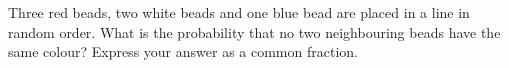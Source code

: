 Three red beads, two white beads and one blue bead are placed in a line in random order. What is the probability that no two neighbouring beads have the same colour? Express your answer as a common fraction.
